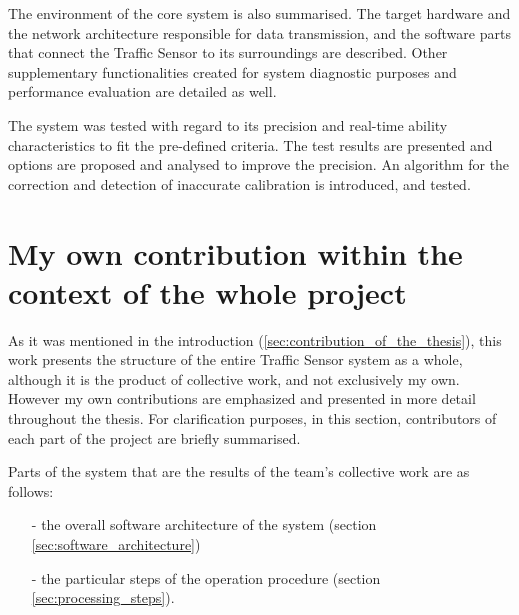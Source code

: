 The environment of the core system is also summarised.
The target hardware and the network architecture responsible for data transmission, and the software parts that connect the Traffic Sensor to its surroundings are described.
Other supplementary functionalities created for system diagnostic purposes and performance evaluation are detailed as well.

The system was tested with regard to its precision and real-time ability characteristics to fit the pre-defined criteria.
The test results are presented and options are proposed and analysed to improve the precision.
An algorithm for the correction and detection of inaccurate calibration is introduced, and tested.

\section{My own contribution within the context of the whole project}
As it was mentioned in the introduction (\ref{sec:contribution_of_the_thesis}), this work presents the structure of the entire Traffic Sensor system as a whole, although it is the product of collective work, and not exclusively my own.
However my own contributions are emphasized and presented in more detail throughout the thesis.
For clarification purposes, in this section, contributors of each part of the project are briefly summarised.

\noindent Parts of the system that are the results of the team's collective work are as follows:
\begin{itemize}
	\item[-] the overall software architecture of the system (section \ref{sec:software_architecture})
	\item[-] the particular steps of the operation procedure (section \ref{sec:processing_steps}).
\end{itemize}


